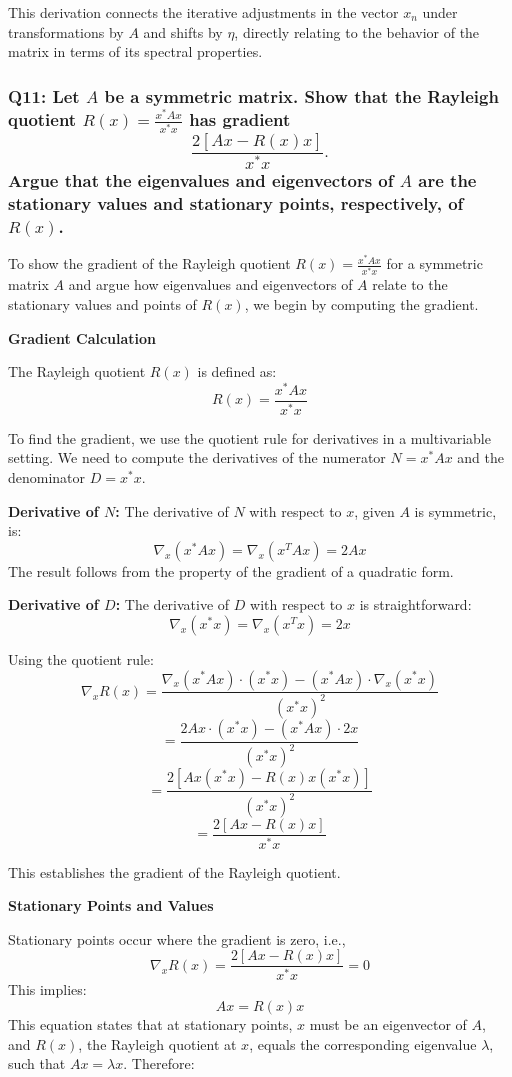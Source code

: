 \documentclass[8pt]{article}
\begin{document}
This derivation connects the iterative adjustments in the vector \(x_n\) under transformations by \(A\) and shifts by \(\eta\), directly relating to the behavior of the matrix in terms of its spectral properties.

\subsubsection*{Q11: Let \(A\) be a symmetric matrix. Show that the Rayleigh quotient \(R(x) = \frac{x^* A x}{x^* x}\) has gradient
\[
\frac{2[Ax - R(x)x]}{x^* x}.
\]
Argue that the eigenvalues and eigenvectors of \(A\) are the stationary values and stationary points, respectively, of \(R(x)\).}

To show the gradient of the Rayleigh quotient \( R(x) = \frac{x^* A x}{x^* x} \) for a symmetric matrix \(A\) and argue how eigenvalues and eigenvectors of \(A\) relate to the stationary values and points of \(R(x)\), we begin by computing the gradient.

\textbf{Gradient Calculation}

The Rayleigh quotient \( R(x) \) is defined as:
\[
R(x) = \frac{x^* A x}{x^* x}
\]

To find the gradient, we use the quotient rule for derivatives in a multivariable setting. We need to compute the derivatives of the numerator \(N = x^* A x\) and the denominator \(D = x^* x\).

\textbf{Derivative of \(N\):}
The derivative of \(N\) with respect to \(x\), given \(A\) is symmetric, is:
\[
\nabla_x (x^* A x) = \nabla_x (x^T A x) = 2Ax
\]
The result follows from the property of the gradient of a quadratic form.

\textbf{Derivative of \(D\):}
The derivative of \(D\) with respect to \(x\) is straightforward:
\[
\nabla_x (x^* x) = \nabla_x (x^T x) = 2x
\]

Using the quotient rule:
\[
\nabla_x R(x) = \frac{\nabla_x (x^* A x) \cdot (x^* x) - (x^* A x) \cdot \nabla_x (x^* x)}{(x^* x)^2}
\]
\[
= \frac{2Ax \cdot (x^* x) - (x^* A x) \cdot 2x}{(x^* x)^2}
\]
\[
= \frac{2[Ax (x^* x) - R(x) x (x^* x)]}{(x^* x)^2}
\]
\[
= \frac{2[Ax - R(x)x]}{x^* x}
\]

This establishes the gradient of the Rayleigh quotient.

\textbf{Stationary Points and Values}

Stationary points occur where the gradient is zero, i.e., 
\[
\nabla_x R(x) = \frac{2[Ax - R(x)x]}{x^* x} = 0
\]
This implies:
\[
Ax = R(x) x
\]
This equation states that at stationary points, \(x\) must be an eigenvector of \(A\), and \(R(x)\), the Rayleigh quotient at \(x\), equals the corresponding eigenvalue \(\lambda\), such that \(Ax = \lambda x\). Therefore:
\end{document}
